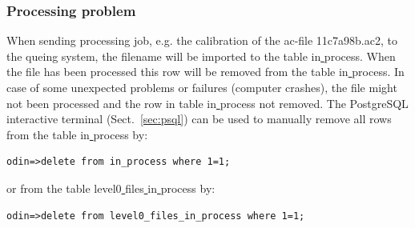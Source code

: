 \documentclass[12pt]{article}
\begin{document}
\subsubsection*{Processing problem}
When sending processing job, e.g. the calibration of the 
ac-file 11c7a98b.ac2, to the queing system, 
the filename will be imported to the table in\underline{ }process.
When the file has been processed this row will be removed 
from the table in\underline{ }process.
In case of some unexpected problems or failures (computer crashes),
the file might not been processed and the row in table in\underline{ }process 
not removed.
The PostgreSQL interactive terminal (Sect.~\ref{sec:psql}) 
can be used to manually remove all rows from the table in\underline{ }process
by:
\begin{verbatim}
odin=>delete from in_process where 1=1;
\end{verbatim}
or from the table level0\underline{ }files\underline{ }in\underline{ }process
by:
\begin{verbatim}
odin=>delete from level0_files_in_process where 1=1;
\end{verbatim}


 






\clearpage
\newpage
\end{document}

